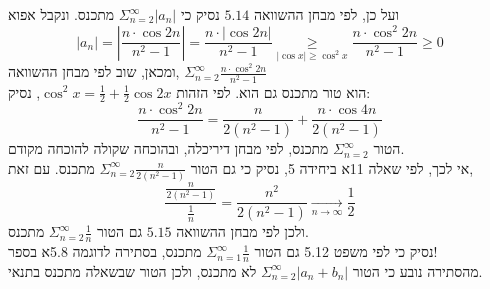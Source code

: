 \documentclass{article}
\newcommand\underrel[2]{\mathrel{\mathop{#2}\limits_{#1}}}
\begin{document}
ועל כן, לפי מבחן ההשוואה $5.14$
נסיק כי $\Sigma_{n=2}^\infty |a_n|$ מתכנס.
ונקבל אפוא
\[
    |a_n|=\left|\frac{n\cdot \cos 2n}{n^2-1}\right| =
    \frac{n\cdot |\cos 2n|}{n^2-1}\underrel{|\cos x| \geq \cos^2x}{\geq}
    \frac{n\cdot \cos^2 2n}{n^2-1}\geq 0
\]
ומכאן, שוב לפי מבחן ההשוואה, $\Sigma_{n=2}^\infty \frac{n\cdot \cos^2 2n}{n^2-1}$ \\
הוא טור מתכנס גם הוא. לפי הזהות $\cos^2 x = \frac{1}{2} + \frac{1}{2}\cos 2x$, נסיק:
\[
    \frac{n\cdot \cos^2 2n}{n^2-1} =
    \frac{n}{2(n^2-1)} + \frac{n\cdot \cos 4n}{2(n^2-1)}
\]
הטור $\Sigma_{n=2}^\infty$ מתכנס, לפי מבחן דיריכלה, ובהוכחה שקולה להוכחה מקודם. \\
אי לכך, לפי שאלה 11א ביחידה 5, נסיק כי
גם הטור $\Sigma_{n=2}^\infty \frac{n}{2(n^2-1)}$ מתכנס.
עם זאת,
\[
    \frac{\frac{n}{2(n^2-1)}}{\frac{1}{n}} =
    \frac{n^2}{2(n^2-1)}\xrightarrow[n\rightarrow \infty ]{} \frac{1}{2}
\]
ולכן לפי מבחן ההשוואה $5.15$ גם הטור $\Sigma_{n=2}^\infty \frac{1}{n}$ מתכנס. \\
נסיק כי לפי משפט 5.12 גם הטור $\Sigma_{n=1}^\infty \frac{1}{n}$ מתכנס, בסתירה לדוגמה 5.8א בספר!
\\
מהסתירה נובע כי הטור $\Sigma_{n=2}^\infty |a_n+b_n|$ לא מתכנס, ולכן הטור שבשאלה מתכנס בתנאי.
\end{document}
